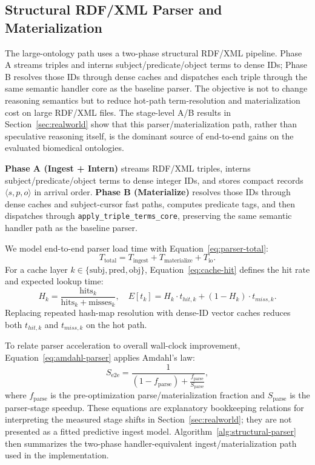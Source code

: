 \documentclass[preprint,12pt,times]{elsarticle}
\begin{document}
\subsection{Structural RDF/XML Parser and Materialization}
\label{sec:structural-parser}

The large-ontology path uses a two-phase structural RDF/XML pipeline. Phase A streams triples and interns subject/predicate/object terms to dense IDs; Phase B resolves those IDs through dense caches and dispatches each triple through the same semantic handler core as the baseline parser. The objective is not to change reasoning semantics but to reduce hot-path term-resolution and materialization cost on large RDF/XML files. The stage-level A/B results in Section~\ref{sec:realworld} show that this parser/materialization path, rather than speculative reasoning itself, is the dominant source of end-to-end gains on the evaluated biomedical ontologies.

\textbf{Phase A (Ingest + Intern)} streams RDF/XML triples, interns subject/predicate/object terms to dense integer IDs, and stores compact records $\langle s,p,o\rangle$ in arrival order. \textbf{Phase B (Materialize)} resolves those IDs through dense caches and subject-cursor fast paths, computes predicate tags, and then dispatches through \texttt{apply\_triple\_terms\_core}, preserving the same semantic handler path as the baseline parser.

We model end-to-end parser load time with Equation~\ref{eq:parser-total}:
\begin{equation}
T_{\text{total}} = T_{\text{ingest}} + T_{\text{materialize}} + T_{\text{io}}.
\label{eq:parser-total}
\end{equation}
For a cache layer $k \in \{\text{subj}, \text{pred}, \text{obj}\}$, Equation~\ref{eq:cache-hit} defines the hit rate and expected lookup time:
\begin{equation}
H_k = \frac{\text{hits}_k}{\text{hits}_k + \text{misses}_k}, \quad
E[t_k] = H_k \cdot t_{hit,k} + (1-H_k)\cdot t_{miss,k}.
\label{eq:cache-hit}
\end{equation}
Replacing repeated hash-map resolution with dense-ID vector caches reduces both $t_{hit,k}$ and $t_{miss,k}$ on the hot path.

To relate parser acceleration to overall wall-clock improvement, Equation~\ref{eq:amdahl-parser} applies Amdahl's law:
\begin{equation}
S_{\text{e2e}} = \frac{1}{(1-f_{\text{parse}}) + \frac{f_{\text{parse}}}{S_{\text{parse}}}},
\label{eq:amdahl-parser}
\end{equation}
where $f_{\text{parse}}$ is the pre-optimization parse/materialization fraction and $S_{\text{parse}}$ is the parser-stage speedup.
These equations are explanatory bookkeeping relations for interpreting the measured stage shifts in Section~\ref{sec:realworld}; they are not presented as a fitted predictive ingest model. Algorithm~\ref{alg:structural-parser} then summarizes the two-phase handler-equivalent ingest/materialization path used in the implementation.
\end{document}
